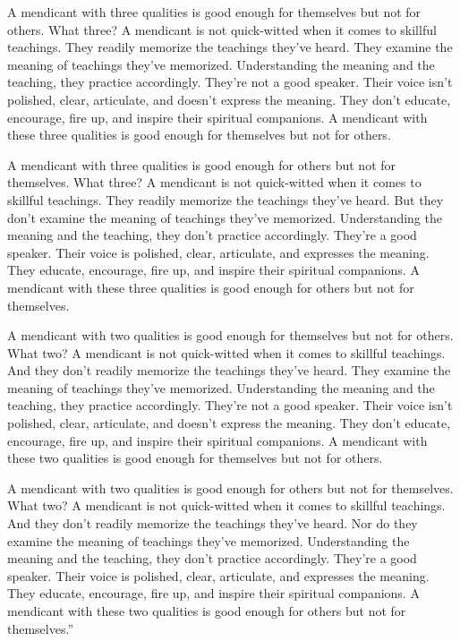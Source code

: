 \documentclass[12pt,openany]{book}%
\begin{document}
A mendicant with three qualities is good enough for themselves but not for others. What three? A mendicant is not quick-witted when it comes to skillful teachings. They readily memorize the teachings they’ve heard. They examine the meaning of teachings they’ve memorized. Understanding the meaning and the teaching, they practice accordingly. They’re not a good speaker. Their voice isn’t polished, clear, articulate, and doesn’t express the meaning. They don’t educate, encourage, fire up, and inspire their spiritual companions. A mendicant with these three qualities is good enough for themselves but not for others. 

A mendicant with three qualities is good enough for others but not for themselves. What three? A mendicant is not quick-witted when it comes to skillful teachings. They readily memorize the teachings they’ve heard. But they don’t examine the meaning of teachings they’ve memorized. Understanding the meaning and the teaching, they don’t practice accordingly. They’re a good speaker. Their voice is polished, clear, articulate, and expresses the meaning. They educate, encourage, fire up, and inspire their spiritual companions. A mendicant with these three qualities is good enough for others but not for themselves. 

A mendicant with two qualities is good enough for themselves but not for others. What two? A mendicant is not quick-witted when it comes to skillful teachings. And they don’t readily memorize the teachings they’ve heard. They examine the meaning of teachings they’ve memorized. Understanding the meaning and the teaching, they practice accordingly. They’re not a good speaker. Their voice isn’t polished, clear, articulate, and doesn’t express the meaning. They don’t educate, encourage, fire up, and inspire their spiritual companions. A mendicant with these two qualities is good enough for themselves but not for others. 

A mendicant with two qualities is good enough for others but not for themselves. What two? A mendicant is not quick-witted when it comes to skillful teachings. And they don’t readily memorize the teachings they’ve heard. Nor do they examine the meaning of teachings they’ve memorized. Understanding the meaning and the teaching, they don’t practice accordingly. They’re a good speaker. Their voice is polished, clear, articulate, and expresses the meaning. They educate, encourage, fire up, and inspire their spiritual companions. A mendicant with these two qualities is good enough for others but not for themselves.” 
\end{document}
